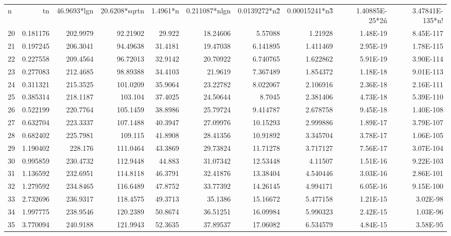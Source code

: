 \documentclass[a4paper]{article}
\begin{document}
{\begin{tabular}{|l|r|r|r|r|r|r|r|r|r|}
    \hline
    n     & {tn} & {46.9693*lgn} & {20.6208*sqrtn} & {1.4961*n} & {0.211087*nlgn} & {0.0139272*n\^2} & {0.00015241*n\^3} & {1.40885E-25*2\^n} & {3.47841E-135*n!} \\
    {20} & 0.181176 & 202.9979 & 92.21902 & 29.922 & 18.24606 & 5.57088 & 1.21928 & 1.48E-19 & 8.45E-117 \\
    {21} & 0.197245 & 206.3041 & 94.49638 & 31.4181 & 19.47038 & 6.141895 & 1.411469 & 2.95E-19 & 1.78E-115 \\
    {22} & 0.227558 & 209.4564 & 96.72013 & 32.9142 & 20.70922 & 6.740765 & 1.622862 & 5.91E-19 & 3.90E-114 \\
    {23} & 0.277083 & 212.4685 & 98.89388 & 34.4103 & 21.9619 & 7.367489 & 1.854372 & 1.18E-18 & 9.01E-113 \\
    {24} & 0.311321 & 215.3525 & 101.0209 & 35.9064 & 23.22782 & 8.022067 & 2.106916 & 2.36E-18 & 2.16E-111 \\
    {25} & 0.385314 & 218.1187 & 103.104 & 37.4025 & 24.50644 & 8.7045 & 2.381406 & 4.73E-18 & 5.39E-110 \\
    {26} & 0.522199 & 220.7764 & 105.1459 & 38.8986 & 25.79724 & 9.414787 & 2.678758 & 9.45E-18 & 1.40E-108 \\
    {27} & 0.632704 & 223.3337 & 107.1488 & 40.3947 & 27.09976 & 10.15293 & 2.999886 & 1.89E-17 & 3.79E-107 \\
    {28} & 0.682402 & 225.7981 & 109.115 & 41.8908 & 28.41356 & 10.91892 & 3.345704 & 3.78E-17 & 1.06E-105 \\
    {29} & 1.190402 & 228.176 & 111.0464 & 43.3869 & 29.73824 & 11.71278 & 3.717127 & 7.56E-17 & 3.07E-104 \\
    {30} & 0.995859 & 230.4732 & 112.9448 & 44.883 & 31.07342 & 12.53448 & 4.11507 & 1.51E-16 & 9.22E-103 \\
    {31} & 1.136592 & 232.6951 & 114.8118 & 46.3791 & 32.41876 & 13.38404 & 4.540446 & 3.03E-16 & 2.86E-101 \\
    {32} & 1.279592 & 234.8465 & 116.6489 & 47.8752 & 33.77392 & 14.26145 & 4.994171 & 6.05E-16 & 9.15E-100 \\
    {33} & 2.732696 & 236.9317 & 118.4575 & 49.3713 & 35.1386 & 15.16672 & 5.477158 & 1.21E-15 & 3.02E-98 \\
    {34} & 1.997775 & 238.9546 & 120.2389 & 50.8674 & 36.51251 & 16.09984 & 5.990323 & 2.42E-15 & 1.03E-96 \\
    {35} & 3.770094 & 240.9188 & 121.9943 & 52.3635 & 37.89537 & 17.06082 & 6.534579 & 4.84E-15 & 3.58E-95 \\

\end{tabular}}
\end{document}
